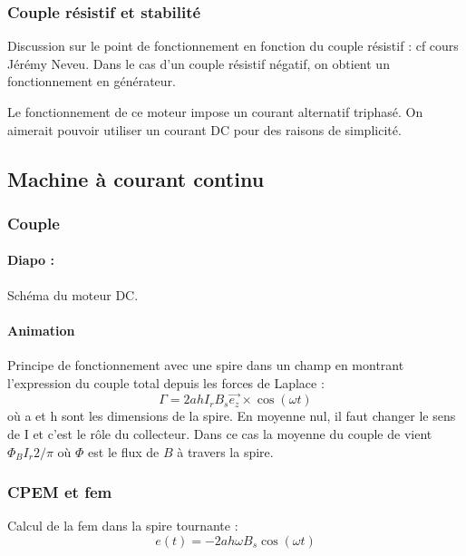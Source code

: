 \subsubsection{Couple résistif et stabilité}

Discussion sur le point de fonctionnement en fonction du couple résistif : cf cours Jérémy Neveu.
Dans le cas d'un couple résistif négatif, on obtient un fonctionnement en générateur.

Le fonctionnement de ce moteur impose un courant alternatif triphasé.
On aimerait pouvoir utiliser un courant DC pour des raisons de simplicité.

\subsection{Machine à courant continu}

\subsubsection{Couple}

\paragraph{Diapo : } Schéma du moteur DC.

\paragraph{Animation}

Principe de fonctionnement avec une spire dans un champ en montrant l'expression du couple total depuis les forces de Laplace :
\begin{equation}
\Gamma = 2ahI_rB_s\overrightarrow{e_z}\times\cos(\omega t)
\end{equation}
où a et h sont les dimensions de la spire.
En moyenne nul, il faut changer le sens de I et c'est le rôle du collecteur.
Dans ce cas la moyenne du couple de vient $\Phi_BI_r2/\pi$ où $\Phi$ est le flux de $B$ à travers la spire.

\subsubsection{CPEM et fem}

Calcul de la fem dans la spire tournante :
\begin{equation}
e(t) = -2ah\omega B_s\cos(\omega t)
\end{equation}

